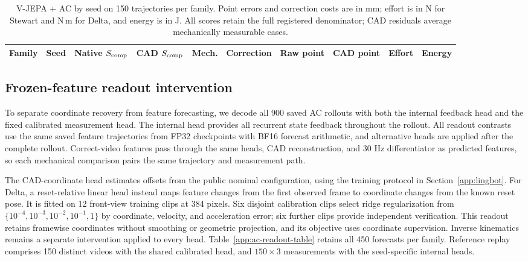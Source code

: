 \documentclass[10pt,twocolumn,letterpaper]{article}
\begin{document}
\begin{table}[t]
\caption{V-JEPA + AC by seed on 150 trajectories per family. Point errors and correction costs are in mm; effort is in N for Stewart and N\,m for Delta, and energy is in J. All scores retain the full registered denominator; CAD residuals average mechanically measurable cases.}
\label{app:spatial-ac-seeds}
\centering\small
\setlength{\tabcolsep}{4pt}
\begin{tabular}{llrrrrrrrr}
\toprule
Family & Seed & Native $S_{\rm comp}$ & CAD $S_{\rm comp}$ & Mech. & Correction & Raw point & CAD point & Effort & Energy\\
\midrule

\bottomrule
\end{tabular}
\end{table}

\subsection{Frozen-feature readout intervention}
\label{app:ac-readout}
To separate coordinate recovery from feature forecasting, we decode all 900 saved AC rollouts with both the internal feedback head and the fixed calibrated measurement head. The internal head provides all recurrent state feedback throughout the rollout. All readout contrasts use the same saved feature trajectories from FP32 checkpoints with BF16 forecast arithmetic, and alternative heads are applied after the complete rollout. Correct-video features pass through the same heads, CAD reconstruction, and 30 Hz differentiator as predicted features, so each mechanical comparison pairs the same trajectory and measurement path.

The CAD-coordinate head estimates offsets from the public nominal configuration, using the training protocol in Section~\ref{app:lingbot}. For Delta, a reset-relative linear head instead maps feature changes from the first observed frame to coordinate changes from the known reset pose. It is fitted on 12 front-view training clips at 384 pixels. Six disjoint calibration clips select ridge regularization from $\{10^{-4},10^{-3},10^{-2},10^{-1},1\}$ by coordinate, velocity, and acceleration error; six further clips provide independent verification. This readout retains framewise coordinates without smoothing or geometric projection, and its objective uses coordinate supervision. Inverse kinematics remains a separate intervention applied to every head. Table~\ref{app:ac-readout-table} retains all 450 forecasts per family. Reference replay comprises 150 distinct videos with the shared calibrated head, and $150\times3$ measurements with the seed-specific internal heads.
\end{document}
